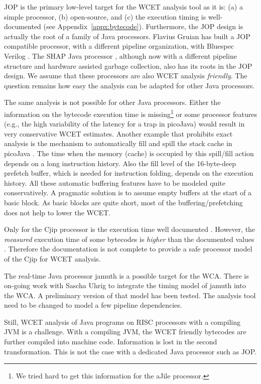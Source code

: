 JOP is the primary low-level target for the WCET analysis tool as it
is: (a) a simple processor, (b) open-source, and (c) the execution
timing is well-documented (see Appendix~\ref{appx:bytecode}).
Furthermore, the JOP design is actually the root of a family of Java
processors. Flavius Gruian has built a JOP compatible processor, with
a different pipeline organization, with Bluespec Verilog
\cite{flavius:bluejep}. The SHAP Java processor \cite{shap}, although
now with a different pipeline structure and hardware assisted garbage
collection, also has its roots in the JOP design. We assume that
these processors are also WCET analysis \emph{friendly}. The question
remains how easy the analysis can be adapted for other Java
processors.


The same analysis is not possible for other Java processors. Either
the information on the bytecode execution time is missing\footnote{We
tried hard to get this information for the aJile processor.} or some
processor features (e.g., the high variability of the latency for a
trap in picoJava) would result in very conservative WCET estimates.
Another example that prohibits exact analysis is the mechanism to
automatically fill and spill the stack cache in picoJava
\cite{pjMicroArch,pjProgRef}. The time when the memory (cache) is
occupied by this spill/fill action depends on a long instruction
history. Also the fill level of the 16-byte-deep prefetch buffer,
which is needed for instruction folding, depends on the execution
history. All these automatic buffering features have to be modeled
quite conservatively. A pragmatic solution is to assume empty buffers
at the start of a basic block. As basic blocks are quite short, most
of the buffering/prefetching does not help to lower the WCET.

Only for the Cjip processor is the execution time well documented
\cite{CjipRef}. However, the \emph{measured} execution time of some
bytecodes is \emph{higher} than the documented values
\cite{jop:thesis}. Therefore the documentation is not complete to
provide a safe processor model of the Cjip for WCET analysis.

The real-time Java processor jamuth \cite{jamuth:jtres07} is a
possible target for the WCA. There is on-going work with Sascha Uhrig
to integrate the timing model of jamuth into the WCA. A preliminary
version of that model has been tested. The analysis tool need to be
changed to model a few pipeline dependencies.

Still, WCET analysis of Java programs on RISC processors with a
compiling JVM is a challenge. With a compiling JVM, the WCET friendly
bytecodes are further compiled into machine code. Information is lost
in the second transformation. This is not the case with a dedicated
Java processor such as JOP.

